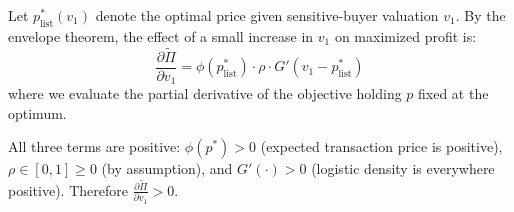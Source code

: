 Let $p_{\mathrm{list}}^*(v_1)$ denote the optimal price given sensitive-buyer valuation $v_1$. By the envelope theorem, the effect of a small increase in $v_1$ on maximized profit is:
\begin{equation}
    \frac{\partial \tilde{\Pi}}{\partial v_1} = \phi(p_{\mathrm{list}}^*) \cdot \rho \cdot G'(v_1 - p_{\mathrm{list}}^*)
\end{equation}
where we evaluate the partial derivative of the objective holding $p$ fixed at the optimum.

All three terms are positive: $\phi(p^*) > 0$ (expected transaction price is positive), $\rho \in [0,1] \geq 0$ (by assumption), and $G'(\cdot) > 0$ (logistic density is everywhere positive). Therefore $\frac{\partial \tilde{\Pi}}{\partial v_1} > 0$.
